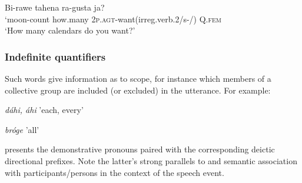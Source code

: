 \documentclass[output=paper]{LSP/langsci}
\begin{document}
\ea  \gll Bi-rawe   tahena   ra-gusta         		 ja? 	\\			          		
`moon-count  how.many    2\textsc{p.agt}-want(irreg.verb.2/s-/) Q.\textsc{fem}	\\					
\glt `How many calendars do you want?'  
\z

\subsubsection{Indefinite quantifiers}  

Such words give information as to scope, for instance which members of a collective group are included (or excluded) in the utterance. For example:  

\hspace{2em} \textit{dáhi, áhi}  'each, every'

\hspace{2em} \textit{bróge}  'all'
       								                   	 
 presents the demonstrative pronouns paired with the corresponding deictic directional prefixes.  Note the latter's strong parallels to and semantic association with  participants/persons in the context of the speech event.

\begin{table}
\caption{Comparison of demonstrative pronouns to deictic directional prefixes} \label{demonstrative}
\end{table}
\end{document}
